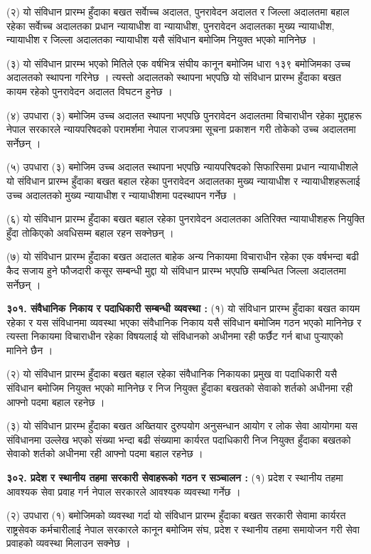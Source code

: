 (२) यो संविधान प्रारम्भ हुँदाका बखत सर्वाेच्च अदालत, पुनरावेदन अदालत र जिल्ला अदालतमा बहाल रहेका सर्वाेच्च अदालतका प्रधान न्यायाधीश वा न्यायाधीश, पुनरावेदन अदालतका मुख्य न्यायाधीश, न्यायाधीश र जिल्ला अदालतका न्यायाधीश यसै संविधान बमोजिम नियुक्त भएको मानिनेछ ।

(३) यो संविधान प्रारम्भ भएको मितिले एक वर्षभित्र संघीय कानून बमोजिम धारा १३९ बमोजिमका उच्च अदालतको स्थापना गरिनेछ । त्यस्तो अदालतको स्थापना भएपछि यो संविधान प्रारम्भ हुँदाका बखत कायम रहेको पुनरावेदन अदालत विघटन हुनेछ ।

(४) उपधारा (३) बमोजिम उच्च अदालत स्थापना भएपछि पुनरावेदन अदालतमा विचाराधीन रहेका मुद्दाहरू नेपाल सरकारले न्यायपरिषदको परामर्शमा नेपाल राजपत्रमा सूचना प्रकाशन गरी तोकेको उच्च अदालतमा सर्नेछन् ।

(५) उपधारा (३) बमोजिम उच्च अदालत स्थापना भएपछि न्यायपरिषदको सिफारिसमा प्रधान न्यायाधीशले यो संविधान प्रारम्भ हुँदाका बखत बहाल रहेका पुनरावेदन अदालतका मुख्य न्यायाधीश र न्यायाधीशहरूलाई उच्च अदालतको मुख्य न्यायाधीश र न्यायाधीशमा पदस्थापन गर्नेछ ।

(६) यो संविधान प्रारम्भ हुँदाका बखत बहाल रहेका पुनरावेदन अदालतका अतिरिक्त न्यायाधीशहरू नियुक्ति हुँदा तोकिएको अवधिसम्म बहाल रहन सक्नेछन् ।

(७) यो संविधान प्रारम्भ हुँदाका बखत अदालत बाहेक अन्य निकायमा विचाराधीन रहेका एक वर्षभन्दा बढी कैद सजाय हुने फौजदारी कसूर सम्बन्धी मुद्दा यो संविधान प्रारम्भ भएपछि सम्बन्धित जिल्ला अदालतमा सर्नेछन् ।

\textbf{३०१. संवैधानिक निकाय र पदाधिकारी सम्बन्धी व्यवस्था :} (१) यो संविधान प्रारम्भ हुँदाका बखत कायम रहेका र यस संविधानमा व्यवस्था भएका संवैधानिक निकाय यसै संविधान बमोजिम गठन भएको मानिनेछ र त्यस्ता निकायमा विचाराधीन रहेका विषयलाई यो संविधानको अधीनमा रही फर्छैट गर्न बाधा पुर्‍याएको मानिने छैन ।

(२) यो संविधान प्रारम्भ हुँदाका बखत बहाल रहेका संवैधानिक निकायका प्रमुख वा पदाधिकारी यसै संविधान बमोजिम नियुक्त भएको मानिनेछ र निज नियुक्त हुँदाका बखतको सेवाको शर्तको अधीनमा रही आफ्नो पदमा बहाल रहनेछ ।

(३) यो संविधान प्रारम्भ हुँदाका बखत अख्तियार दुरुपयोग अनुसन्धान आयोग र लोक सेवा आयोगमा यस संविधानमा उल्लेख भएको संख्या भन्दा बढी संख्यामा कार्यरत पदाधिकारी निज नियुक्त हुँदाका बखतको सेवाको शर्तको अधीनमा रही आफ्नो पदमा बहाल रहनेछ ।

\textbf{३०२. प्रदेश र स्थानीय तहमा सरकारी सेवाहरूको गठन र सञ्चालन :} (१) प्रदेश र स्थानीय तहमा आवश्यक सेवा प्रवाह गर्न नेपाल सरकारले आवश्यक व्यवस्था गर्नेछ ।

(२) उपधारा (१) बमोजिमको व्यवस्था गर्दा यो संविधान प्रारम्भ हुँदाका बखत सरकारी सेवामा कार्यरत राष्ट्रसेवक कर्मचारीलाई नेपाल सरकारले कानून बमोजिम संघ, प्रदेश र स्थानीय तहमा समायोजन गरी सेवा प्रवाहको व्यवस्था मिलाउन सक्नेछ ।

